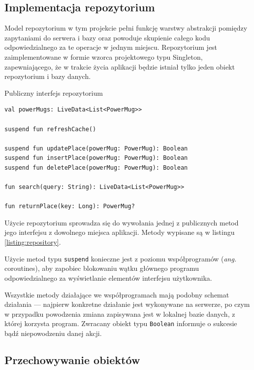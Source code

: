 \documentclass[polish,polish,a4paper,12pt]{article}
\begin{document}
	\subsection{Implementacja repozytorium}

	Model repozytorium w tym projekcie pełni funkcję warstwy abstrakcji pomiędzy zapytaniami do serwera i bazy oraz powoduje skupienie całego kodu odpowiedzialnego za te operacje w jednym miejscu. Repozytorium jest zaimplementowane w formie wzorca projektowego typu Singleton, zapewniającego, że w trakcie życia aplikacji będzie istniał tylko jeden obiekt repozytorium i bazy danych.

	\begin{listing}[H]
		\caption{Publiczny interfejs repozytorium}
		\begin{verbatim}
val powerMugs: LiveData<List<PowerMug>>

suspend fun refreshCache()

suspend fun updatePlace(powerMug: PowerMug): Boolean
suspend fun insertPlace(powerMug: PowerMug): Boolean
suspend fun deletePlace(powerMug: PowerMug): Boolean

fun search(query: String): LiveData<List<PowerMug>>

fun returnPlace(key: Long): PowerMug?
		\end{verbatim}
		\label{listing:repository}
	\end{listing}

	Użycie repozytorium sprowadza się do wywołania jednej z publicznych metod jego interfejsu z dowolnego miejsca aplikacji. Metody wypisane są w listingu \ref{listing:repository}.

	Użycie metod typu \texttt{suspend} konieczne jest z poziomu współprogramów (\textit{ang.} coroutines), aby zapobiec blokowaniu wątku głównego programu odpowiedzialnego za wyświetlanie elementów interfejsu użytkownika.

	Wszystkie metody działające we współprogramach mają podobny schemat działania — najpierw konkretne działanie jest wykonywane na serwerze, po czym w przypadku powodzenia zmiana zapisywana jest w lokalnej bazie danych, z której korzysta program. Zwracany obiekt typu \texttt{Boolean} informuje o sukcesie bądź niepowodzeniu danej akcji.

	\subsection{Przechowywanie obiektów}
\end{document}
